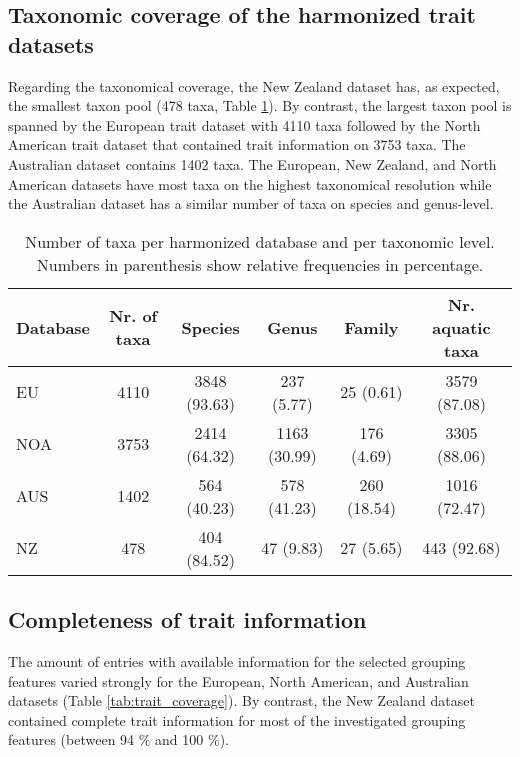 \documentclass[../Draft_harmonization_paper.tex]{subfiles}
\begin{document}
\subsection*{Taxonomic coverage of the harmonized trait datasets}

Regarding the taxonomical coverage, the New Zealand dataset has, as expected, the smallest taxon pool (478 taxa, Table \ref{tab:tax_coverage}). By contrast, the largest taxon pool is spanned by the European trait dataset with 4110 taxa followed by the North American trait dataset that contained trait information on 3753 taxa. The Australian dataset contains 1402 taxa. The European, New Zealand, and North American datasets have most taxa on the highest taxonomical resolution while the Australian dataset has a similar number of taxa on species and genus-level.

\begin{table}[ht]
    \centering
    \caption{Number of taxa per harmonized database and per taxonomic level. Numbers in parenthesis show relative frequencies in percentage.}
    \label{tab:tax_coverage}
    \begin{tabular}{lccccc}
    \toprule[.1em]
    Database & Nr. of taxa & Species & Genus & Family & Nr. aquatic taxa \\ 
    \toprule[.1em]
    EU & 4110 & 3848 (93.63) & 237 (5.77) & 25 (0.61) & 3579 (87.08) \\ 
    NOA & 3753 & 2414 (64.32) & 1163 (30.99) & 176 (4.69) & 3305 (88.06) \\ 
    AUS & 1402 & 564 (40.23) & 578 (41.23) & 260 (18.54) & 1016 (72.47) \\ 
    NZ & 478 & 404 (84.52) & 47 (9.83) & 27 (5.65) & 443 (92.68) \\ 
    \bottomrule
    \end{tabular}
\end{table}


\subsection*{Completeness of trait information}

The amount of entries with available information for the selected grouping features varied strongly for the European, North American, and Australian datasets (Table \ref{tab:trait_coverage}). By contrast, the New Zealand dataset contained complete trait information for most of the investigated grouping features (between 94 \% and 100 \%).
\end{document}
